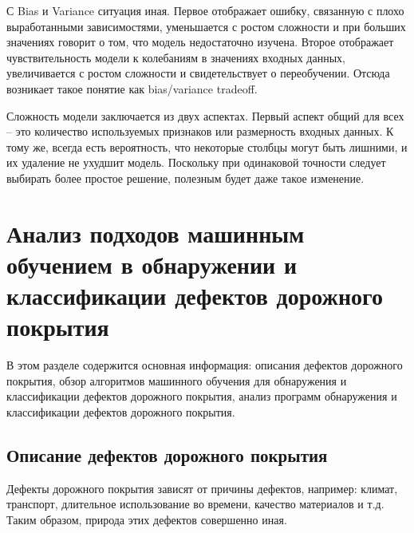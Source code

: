 \documentclass[a4paper,14pt]{extreport}
\begin{document}
С Bias и Variance ситуация иная. Первое отображает ошибку, связанную с плохо выработанными зависимостями, уменьшается с ростом сложности и при больших значениях говорит о том, что модель недостаточно изучена. Второе отображает чувствительность модели к колебаниям в значениях входных данных, увеличивается с ростом сложности и свидетельствует о переобучении. Отсюда возникает такое понятие как bias/variance tradeoff.

Сложность модели заключается из двух аспектах. Первый аспект общий для всех – это количество используемых признаков или размерность входных данных. К тому же, всегда есть вероятность, что некоторые столбцы могут быть лишними, и их удаление не ухудшит модель. Поскольку при одинаковой точности следует выбирать более простое решение, полезным будет даже такое изменение.

\section{Анализ подходов машинным обучением в обнаружении и классификации дефектов дорожного покрытия}
В этом разделе содержится основная информация: описания дефектов дорожного покрытия, обзор алгоритмов машинного обучения для обнаружения и классификации дефектов дорожного покрытия, анализ программ обнаружения и классификации дефектов дорожного покрытия.
\subsection{Описание дефектов дорожного покрытия}
Дефекты дорожного покрытия зависят от причины дефектов, например: климат, транспорт, длительное использование во времени, качество материалов и т.д. Таким образом, природа этих дефектов совершенно иная.
\end{document}

